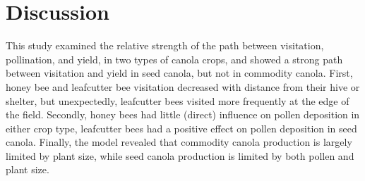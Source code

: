 \documentclass[12pt, draft]{article} %
\begin{document}
\section{Discussion}
This study examined the relative strength of the path between visitation, pollination, and yield, in two types of canola crops, and showed a strong path between visitation and yield in seed canola, but not in commodity canola.
First, honey bee and leafcutter bee visitation decreased with distance from their hive or shelter, but unexpectedly, leafcutter bees visited more frequently at the edge of the field.
Secondly, honey bees had little (direct) influence on pollen deposition in either crop type, leafcutter bees had a positive effect on pollen deposition in seed canola.
Finally, the model revealed that commodity canola production is largely limited by plant size, while seed canola production is limited by both pollen and plant size.
\end{document}
